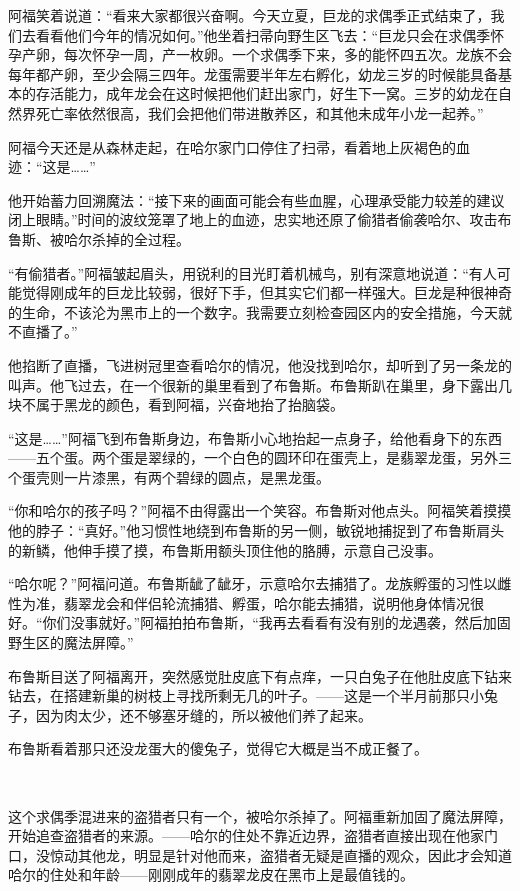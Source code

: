 \documentclass[../main.tex]{subfiles}
\begin{document}
阿福笑着说道：“看来大家都很兴奋啊。今天立夏，巨龙的求偶季正式结束了，我们去看看他们今年的情况如何。”他坐着扫帚向野生区飞去：“巨龙只会在求偶季怀孕产卵，每次怀孕一周，产一枚卵。一个求偶季下来，多的能怀四五次。龙族不会每年都产卵，至少会隔三四年。龙蛋需要半年左右孵化，幼龙三岁的时候能具备基本的存活能力，成年龙会在这时候把他们赶出家门，好生下一窝。三岁的幼龙在自然界死亡率依然很高，我们会把他们带进散养区，和其他未成年小龙一起养。”

阿福今天还是从森林走起，在哈尔家门口停住了扫帚，看着地上灰褐色的血迹：“这是……”

他开始蓄力回溯魔法：“接下来的画面可能会有些血腥，心理承受能力较差的建议闭上眼睛。”时间的波纹笼罩了地上的血迹，忠实地还原了偷猎者偷袭哈尔、攻击布鲁斯、被哈尔杀掉的全过程。

“有偷猎者。”阿福皱起眉头，用锐利的目光盯着机械鸟，别有深意地说道：“有人可能觉得刚成年的巨龙比较弱，很好下手，但其实它们都一样强大。巨龙是种很神奇的生命，不该沦为黑市上的一个数字。我需要立刻检查园区内的安全措施，今天就不直播了。”

他掐断了直播，飞进树冠里查看哈尔的情况，他没找到哈尔，却听到了另一条龙的叫声。他飞过去，在一个很新的巢里看到了布鲁斯。布鲁斯趴在巢里，身下露出几块不属于黑龙的颜色，看到阿福，兴奋地抬了抬脑袋。

“这是……”阿福飞到布鲁斯身边，布鲁斯小心地抬起一点身子，给他看身下的东西——五个蛋。两个蛋是翠绿的，一个白色的圆环印在蛋壳上，是翡翠龙蛋，另外三个蛋壳则一片漆黑，有两个碧绿的圆点，是黑龙蛋。

“你和哈尔的孩子吗？”阿福不由得露出一个笑容。布鲁斯对他点头。阿福笑着摸摸他的脖子：“真好。”他习惯性地绕到布鲁斯的另一侧，敏锐地捕捉到了布鲁斯肩头的新鳞，他伸手摸了摸，布鲁斯用额头顶住他的胳膊，示意自己没事。

“哈尔呢？”阿福问道。布鲁斯龇了龇牙，示意哈尔去捕猎了。龙族孵蛋的习性以雌性为准，翡翠龙会和伴侣轮流捕猎、孵蛋，哈尔能去捕猎，说明他身体情况很好。“你们没事就好。”阿福拍拍布鲁斯，“我再去看看有没有别的龙遇袭，然后加固野生区的魔法屏障。”

布鲁斯目送了阿福离开，突然感觉肚皮底下有点痒，一只白兔子在他肚皮底下钻来钻去，在搭建新巢的树枝上寻找所剩无几的叶子。——这是一个半月前那只小兔子，因为肉太少，还不够塞牙缝的，所以被他们养了起来。

布鲁斯看着那只还没龙蛋大的傻兔子，觉得它大概是当不成正餐了。

~\

这个求偶季混进来的盗猎者只有一个，被哈尔杀掉了。阿福重新加固了魔法屏障，开始追查盗猎者的来源。——哈尔的住处不靠近边界，盗猎者直接出现在他家门口，没惊动其他龙，明显是针对他而来，盗猎者无疑是直播的观众，因此才会知道哈尔的住处和年龄——刚刚成年的翡翠龙皮在黑市上是最值钱的。
\end{document}
